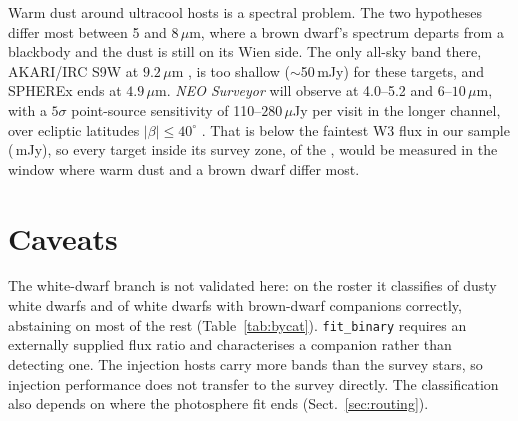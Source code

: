 \documentclass{aa}
\begin{document}
Warm dust around ultracool hosts is a spectral problem. The two hypotheses differ
most between 5 and $8\,\mu$m, where a brown dwarf's spectrum departs from a
blackbody and the dust is still on its Wien side. The only all-sky band there,
AKARI/IRC S9W at $9.2\,\mu$m \citep{ishihara2010}, is too shallow
($\sim$50\,mJy) for these targets, and SPHEREx ends at $4.9\,\mu$m.
\emph{NEO Surveyor} will observe at 4.0--5.2 and $6$--$10\,\mu$m, with a
$5\sigma$ point-source sensitivity of 110--$280\,\mu$Jy per visit in the longer
channel, over ecliptic latitudes $|\beta| \le 40^\circ$ \citep{mainzer2023}. That
is below the faintest W3 flux in our sample (\svWthreeMin\,mJy), so every target inside
its survey zone, \svNeos{} of the \svPool, would be measured in the window where warm dust
and a brown dwarf differ most.

\section{Caveats}
\label{sec:caveats}

The white-dwarf branch is not validated here: on the roster it classifies \wdDiskOK{} of
\wdDiskN{} dusty white dwarfs and \wdCompOK{} of \wdCompN{} white dwarfs with brown-dwarf companions
correctly, abstaining on most of the rest (Table~\ref{tab:bycat}). \texttt{fit\_binary} requires an externally supplied flux ratio
and characterises a companion rather than detecting one. The injection hosts carry
more bands than the survey stars, so injection performance does not transfer to
the survey directly. The classification also depends on where the photosphere
fit ends (Sect.~\ref{sec:routing}).
\end{document}

